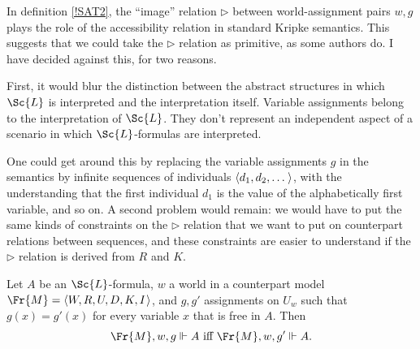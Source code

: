 \documentclass[11pt]{woarticle}
\newcommand{\cmnt}[1]{\iffalse #1 \fi}
\theoremstyle{break}
\theoremstyle{nonumberplain}
\newcommand{\SAT}{\Vdash}
\newcommand{\Img}{\triangleright}
\newcommand{\1}{\;\,|\;\,}
\renewcommand{\t}[1]{\ensuremath{\langle #1  \makebox[.2ex]{}\rangle}}
\begin{document}
\cmnt{%
  \begin{definition}[(Semantic) Consequence]\label{semcons}
    Let $\mathbb{C}$ be a set of models or structures. A formula $A$ is a
    \emph{(local) consequence} of a set of formulas $\Gamma$ \emph{in}
    $\mathbb{C}$ iff for all worlds $w$ in all models in $\mathbb{C}$, whenever
    all members of $\Gamma$ are true at $w$, then so is $A$. Two formulas $A$
    and $B$ are \emph{(locally) equivalent in} $\mathbb{C}$ iff they are
    consequences of one another in $\mathbb{C}$.
  \end{definition}
} %

In definition \ref{!SAT2}, the ``image'' relation $\Img$ between
world-assignment pairs $w,g$ plays the role of the accessibility relation in
standard Kripke semantics. This suggests that we could take the $\Img$ relation
as primitive, as some authors do. I have decided against this, for two reasons.

First, it would blur the distinction between the abstract structures in which
$\Sc{L}$ is interpreted and the interpretation itself. Variable assignments
belong to the interpretation of $\Sc{L}$. They don't represent an independent
aspect of a scenario in which $\Sc{L}$-formulas are interpreted.

One could get around this by replacing the variable assignments $g$ in the
semantics by infinite sequences of individuals $\t{d_{1},d_{2},\ldots}$, with
the understanding that the first individual $d_{1}$ is the value of the
alphabetically first variable, and so on. A second problem would remain:
we would have to put the same kinds of constraints on the $\Img$ relation that
we want to put on counterpart relations between sequences, and these constraints
are easier to understand if the $\Img$ relation is derived from $R$ and
$K$. \label{p:tarski-semantics}

\begin{lemma}\label{locality}
  Let $A$ be an $\Sc{L}$-formula, $w$ a world in a counterpart model
  $\Fr{M} = \t{W,R,U,D,K,I}$, and $g, g'$ assignments on $U_{w}$ such that
  $g(x) = g'(x)$ for every variable $x$ that is free in $A$. Then
  \[
  \Fr{M},w,g \SAT A \text{ iff } \Fr{M},w,g' \SAT A.
  \]
\end{lemma}
\end{document}
